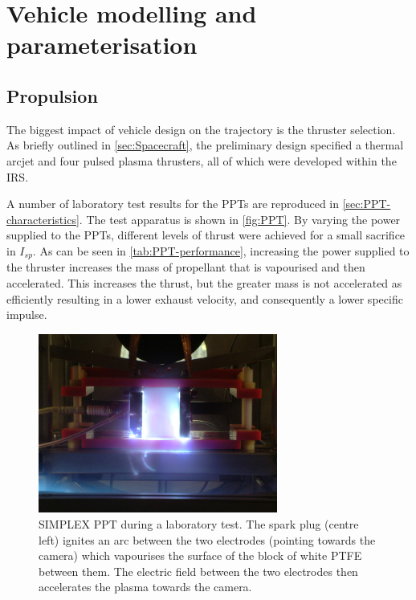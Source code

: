 \chapter{Vehicle modelling and parameterisation}\label{cha:Vehicle}

\section{Propulsion} \label{sec:Propulsion}

The biggest impact of vehicle design on the trajectory is the thruster selection. As briefly outlined in \autoref{sec:Spacecraft}, the preliminary design specified a thermal arcjet and four pulsed plasma thrusters, all of which were developed within the IRS. 

A number of laboratory test results for the PPTs are reproduced in \autoref{sec:PPT-characteristics}. The test apparatus is shown in \autoref{fig:PPT}. By varying the power supplied to the PPTs, different levels of thrust were achieved for a small sacrifice in $I_{sp}$. As can be seen in \autoref{tab:PPT-performance}, increasing the power supplied to the thruster increases the mass of propellant that is vapourised and then accelerated. This increases the thrust, but the greater mass is not accelerated as efficiently resulting in a lower exhaust velocity, and consequently a lower specific impulse. 

\begin{figure}
\centering
\includegraphics[width=0.7\textwidth]{Images/PPT_test.JPG}
\caption{SIMPLEX PPT during a laboratory test. The spark plug (centre left) ignites an arc between the two electrodes (pointing towards the camera) which vapourises the surface of the block of white PTFE between them. The electric field between the two electrodes then accelerates the plasma towards the camera.} \label{fig:PPT}
\end{figure}

